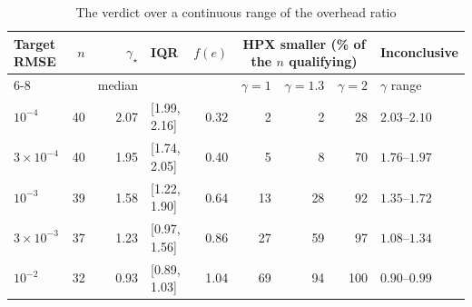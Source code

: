 \begin{table}[t]
\centering
\caption{The verdict over a continuous range of the overhead ratio}
\label{tab:gamma_continuous}
\footnotesize
\begin{tabular}{lrrlrrrrl}
\toprule
Target RMSE & $n$ & $\gamma_\star$ & IQR & $f(e)$ & \multicolumn{3}{c}{HPX smaller (\% of the $n$ qualifying)} & Inconclusive \\
\cmidrule(lr){6-8}
 & & median & & & $\gamma{=}1$ & $\gamma{=}1.3$ & $\gamma{=}2$ & $\gamma$ range \\
\midrule
$10^{-4}$ & 40 & 2.07 & [1.99, 2.16] & 0.32 & 2 & 2 & 28 & $2.03$--$2.10$ \\
$3\times10^{-4}$ & 40 & 1.95 & [1.74, 2.05] & 0.40 & 5 & 8 & 70 & $1.76$--$1.97$ \\
$10^{-3}$ & 39 & 1.58 & [1.22, 1.90] & 0.64 & 13 & 28 & 92 & $1.35$--$1.72$ \\
$3\times10^{-3}$ & 37 & 1.23 & [0.97, 1.56] & 0.86 & 27 & 59 & 97 & $1.08$--$1.34$ \\
$10^{-2}$ & 32 & 0.93 & [0.89, 1.03] & 1.04 & 69 & 94 & 100 & $0.90$--$0.99$ \\
\bottomrule
\end{tabular}
\end{table}
